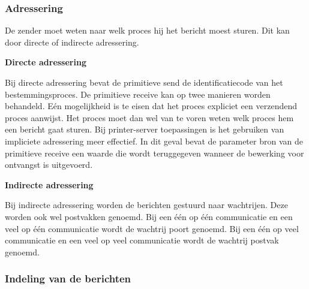 \subsubsection{Adressering}

De zender moet weten naar welk proces hij het bericht moest sturen. Dit kan door directe of indirecte adressering.

\textbf{Directe adressering}

Bij directe adressering bevat de primitieve send de identificatiecode van het bestemmingsproces. De primitieve receive kan op twee manieren worden behandeld. Eén mogelijkheid is te eisen dat het proces expliciet een verzendend proces aanwijst. Het proces moet dan wel van te voren weten welk proces hem een bericht gaat sturen. Bij printer-server toepassingen is het gebruiken van impliciete adressering meer effectief. In dit geval bevat de parameter bron van de primitieve receive een waarde die wordt teruggegeven wanneer de bewerking voor ontvangst is uitgevoerd.

\textbf{Indirecte adressering}

Bij indirecte adressering worden de berichten gestuurd naar wachtrijen. Deze worden ook wel postvakken genoemd. Bij een één op één communicatie en een veel op één communicatie wordt de wachtrij poort genoemd. Bij een één op veel communicatie en een veel op veel communicatie wordt de wachtrij postvak genoemd.


\newpage


\subsubsection{Indeling van de berichten}

